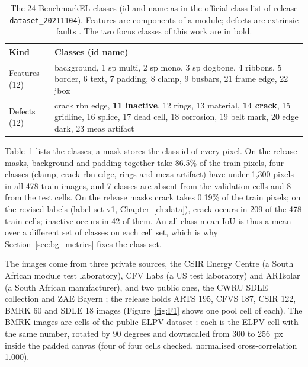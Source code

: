 \begin{table}[htbp]
\centering
\small
\caption{The 24 BenchmarkEL classes (id and name as in the official class list of release \texttt{dataset\_20211104}).
Features are components of a module; defects are extrinsic faults \citep{pratt2023benchmark}. The two focus classes of
this work are in bold.}
\label{tab:bg_classes}
\begin{tabular}{>{\raggedright}p{2.0cm} >{\raggedright\arraybackslash}p{11.5cm}}
\toprule
Kind & Classes (id name) \\
\midrule
Features (12) & 0 background, 1 sp multi, 2 sp mono, 3 sp dogbone, 4 ribbons, 5 border, 6 text, 7 padding, 8 clamp,
9 busbars, 21 frame edge, 22 jbox \\
Defects (12) & 10 crack rbn edge, \textbf{11 inactive}, 12 rings, 13 material, \textbf{14 crack}, 15 gridline, 16 splice,
17 dead cell, 18 corrosion, 19 belt mark, 20 edge dark, 23 meas artifact \\
\bottomrule
\end{tabular}
\end{table}

Table~\ref{tab:bg_classes} lists the classes; a mask stores the class id of every pixel. On the release masks, background and padding together take 86.5\% of the train pixels, four classes
(clamp, crack rbn edge, rings and meas artifact) have under 1,300 pixels in all 478 train images, and 7 classes are absent
from the validation cells and 8 from the test cells. On the release masks crack takes 0.19\% of the train pixels; on the revised labels (label set v1,
Chapter~\ref{ch:data}), crack occurs in 209 of the 478 train cells; inactive occurs in 42 of them. An all-class mean
IoU is thus a mean over a different set of classes on each cell set, which is why Section~\ref{sec:bg_metrics} fixes the
class set.

The images come from three private sources, the CSIR Energy Centre (a South African module test laboratory), CFV Labs (a
US test laboratory) and ARTsolar (a South African manufacturer), and two public ones, the CWRU SDLE collection and ZAE
Bayern \citep{pratt2023benchmark}; the release holds ARTS 195, CFVS 187, CSIR 122, BMRK 60 and SDLE 18 images (Figure~\ref{fig:F1} shows one pool cell of each). The BMRK images are cells of the
public ELPV dataset \citep{deitsch2019elpv}: each is the ELPV cell with the same number, rotated by 90 degrees and downscaled
from 300 to 256~px inside the padded canvas (four of four cells checked, normalised cross-correlation 1.000).

